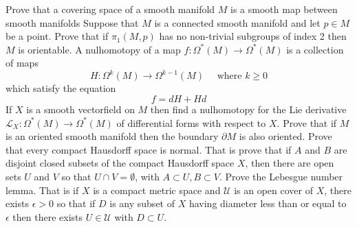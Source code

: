 \documentclass[14pt]{extarticle}
\begin{document}
\newpage
Prove that a covering space of a smooth manifold $M$ is a smooth map between smooth manifolds
\newpage
Suppose that $M$ is a connected smooth manifold and let $p \in M$ be a point. Prove that if $\pi_{1}(M, p)$ has no non-trivial subgroups of index 2 then $M$ is orientable.
\newpage
A nulhomotopy of a map $f: \Omega^{*}(M) \rightarrow \Omega^{*}(M)$ is a collection of maps
$$
H: \Omega^{k}(M) \rightarrow \Omega^{k-1}(M) \quad \text { where } k \geq 0
$$
which satisfy the equation
$$
f=d H+H d
$$
If $X$ is a smooth vectorfield on $M$ then find a nulhomotopy for the Lie derivative $\mathcal{L}_{X}: \Omega^{*}(M) \rightarrow \Omega^{*}(M)$ of differential forms with respect to $X$.
\newpage
Prove that if $M$ is an oriented smooth manifold then the boundary $\partial M$ is also oriented.
\newpage
   Prove that every compact Hausdorff space is normal. That is prove that if $A$ and $B$ are disjoint closed subsets of the compact Hausdorff space $X$, then there are open sets $U$ and $V$ so that $U \cap V=\emptyset$, with $A \subset U, B \subset V$.
\newpage
   Prove the Lebesgue number lemma. That is if $X$ is a compact metric space and $\mathcal{U}$ is an open cover of $X$, there exists $\epsilon>0$ so that if $D$ is any subset of $X$ having diameter less than or equal to $\epsilon$ then there exists $U \in \mathcal{U}$ with $D \subset U$.
\end{document}
